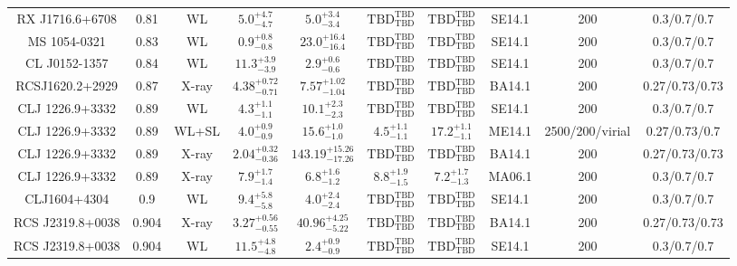 \begin{table}
\begin{tabular}{cccccccccc}
RX J1716.6+6708 & 0.81 & WL & ${5.0}^{+4.7}_{-4.7}$ & ${5.0}^{+3.4}_{-3.4}$ & ${\mathrm{TBD}}^{\mathrm{TBD}}_{\mathrm{TBD}}$ & ${\mathrm{TBD}}^{\mathrm{TBD}}_{\mathrm{TBD}}$ & SE14.1 & 200 & 0.3/0.7/0.7 \\
MS 1054-0321 & 0.83 & WL & ${0.9}^{+0.8}_{-0.8}$ & ${23.0}^{+16.4}_{-16.4}$ & ${\mathrm{TBD}}^{\mathrm{TBD}}_{\mathrm{TBD}}$ & ${\mathrm{TBD}}^{\mathrm{TBD}}_{\mathrm{TBD}}$ & SE14.1 & 200 & 0.3/0.7/0.7 \\
CL J0152-1357 & 0.84 & WL & ${11.3}^{+3.9}_{-3.9}$ & ${2.9}^{+0.6}_{-0.6}$ & ${\mathrm{TBD}}^{\mathrm{TBD}}_{\mathrm{TBD}}$ & ${\mathrm{TBD}}^{\mathrm{TBD}}_{\mathrm{TBD}}$ & SE14.1 & 200 & 0.3/0.7/0.7 \\
RCSJ1620.2+2929 & 0.87 & X-ray & ${4.38}^{+0.72}_{-0.71}$ & ${7.57}^{+1.02}_{-1.04}$ & ${\mathrm{TBD}}^{\mathrm{TBD}}_{\mathrm{TBD}}$ & ${\mathrm{TBD}}^{\mathrm{TBD}}_{\mathrm{TBD}}$ & BA14.1 & 200 & 0.27/0.73/0.73 \\
CLJ 1226.9+3332 & 0.89 & WL & ${4.3}^{+1.1}_{-1.1}$ & ${10.1}^{+2.3}_{-2.3}$ & ${\mathrm{TBD}}^{\mathrm{TBD}}_{\mathrm{TBD}}$ & ${\mathrm{TBD}}^{\mathrm{TBD}}_{\mathrm{TBD}}$ & SE14.1 & 200 & 0.3/0.7/0.7 \\
CLJ 1226.9+3332 & 0.89 & WL+SL & ${4.0}^{+0.9}_{-0.9}$ & ${15.6}^{+1.0}_{-1.0}$ & ${4.5}^{+1.1}_{-1.1}$ & ${17.2}^{+1.1}_{-1.1}$ & ME14.1 & 2500/200/virial & 0.27/0.73/0.7 \\
CLJ 1226.9+3332 & 0.89 & X-ray & ${2.04}^{+0.32}_{-0.36}$ & ${143.19}^{+15.26}_{-17.26}$ & ${\mathrm{TBD}}^{\mathrm{TBD}}_{\mathrm{TBD}}$ & ${\mathrm{TBD}}^{\mathrm{TBD}}_{\mathrm{TBD}}$ & BA14.1 & 200 & 0.27/0.73/0.73 \\
CLJ 1226.9+3332 & 0.89 & X-ray & ${7.9}^{+1.7}_{-1.4}$ & ${6.8}^{+1.6}_{-1.2}$ & ${8.8}^{+1.9}_{-1.5}$ & ${7.2}^{+1.7}_{-1.3}$ & MA06.1 & 200 & 0.3/0.7/0.7 \\
CLJ1604+4304 & 0.9 & WL & ${9.4}^{+5.8}_{-5.8}$ & ${4.0}^{+2.4}_{-2.4}$ & ${\mathrm{TBD}}^{\mathrm{TBD}}_{\mathrm{TBD}}$ & ${\mathrm{TBD}}^{\mathrm{TBD}}_{\mathrm{TBD}}$ & SE14.1 & 200 & 0.3/0.7/0.7 \\
RCS J2319.8+0038 & 0.904 & X-ray & ${3.27}^{+0.56}_{-0.55}$ & ${40.96}^{+4.25}_{-5.22}$ & ${\mathrm{TBD}}^{\mathrm{TBD}}_{\mathrm{TBD}}$ & ${\mathrm{TBD}}^{\mathrm{TBD}}_{\mathrm{TBD}}$ & BA14.1 & 200 & 0.27/0.73/0.73 \\
RCS J2319.8+0038 & 0.904 & WL & ${11.5}^{+4.8}_{-4.8}$ & ${2.4}^{+0.9}_{-0.9}$ & ${\mathrm{TBD}}^{\mathrm{TBD}}_{\mathrm{TBD}}$ & ${\mathrm{TBD}}^{\mathrm{TBD}}_{\mathrm{TBD}}$ & SE14.1 & 200 & 0.3/0.7/0.7 \\

\end{tabular}
\end{table}
